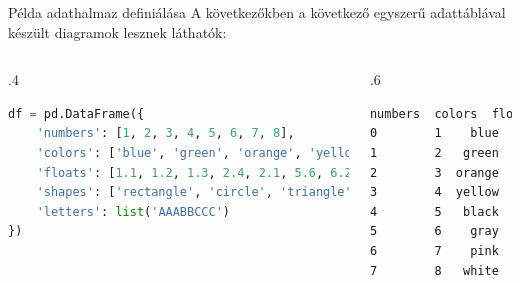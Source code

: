 \documentclass[english, aspectratio=169]{beamer}
\begin{document}
	\begin{frame}[fragile]{Példa adathalmaz definiálása}
		A következőkben a következő egyszerű adattáblával készült diagramok lesznek láthatók:
		\begin{columns}
			\begin{column}{.4\textwidth}
				\begin{lstlisting}[language=python]
df = pd.DataFrame({
	'numbers': [1, 2, 3, 4, 5, 6, 7, 8],
	'colors': ['blue', 'green', 'orange', 'yellow', 'black', 'gray', 'pink', 'white'],
	'floats': [1.1, 1.2, 1.3, 2.4, 2.1, 5.6, 6.2, 5.3],
	'shapes': ['rectangle', 'circle', 'triangle', 'rectangle', 'circle', 'triangle', 'rectangle', 'circle'],
	'letters': list('AAABBCCC')
})
				\end{lstlisting}
			\end{column}
			\begin{column}{.6\textwidth}
				\begin{lstlisting}[language=bash]
   numbers  colors  floats     shapes letters
0        1    blue     1.1  rectangle       A
1        2   green     1.2     circle       A
2        3  orange     1.3   triangle       A
3        4  yellow     2.4  rectangle       B
4        5   black     2.1     circle       B
5        6    gray     5.6   triangle       C
6        7    pink     6.2  rectangle       C
7        8   white     5.3     circle       C
				\end{lstlisting}
			\end{column}
		\end{columns}
	\end{frame}
	
\end{document}
